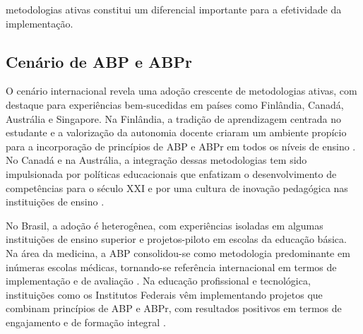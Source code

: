 metodologias ativas constitui um diferencial importante para a efetividade da implementação.

\subsection{Cenário de ABP e ABPr}
\label{subsec:cenario_abp_abpr}

O cenário internacional revela uma adoção crescente de metodologias ativas, com destaque para experiências bem-sucedidas em países como Finlândia, Canadá, Austrália e Singapore. Na Finlândia, a tradição de aprendizagem centrada no estudante e a valorização da autonomia docente criaram um ambiente propício para a incorporação de princípios de ABP e ABPr em todos os níveis de ensino \cite{BONWELL1991}. No Canadá e na Austrália, a integração dessas metodologias tem sido impulsionada por políticas educacionais que enfatizam o desenvolvimento de competências para o século XXI e por uma cultura de inovação pedagógica nas instituições de ensino \cite{BARRON1998}.

No Brasil, a adoção é heterogênea, com experiências isoladas em algumas instituições de ensino superior e projetos-piloto em escolas da educação básica. Na área da medicina, a ABP consolidou-se como metodologia predominante em inúmeras escolas médicas, tornando-se referência internacional em termos de implementação e de avaliação \cite{GOMES2009}. Na educação profissional e tecnológica, instituições como os Institutos Federais vêm implementando projetos que combinam princípios de ABP e ABPr, com resultados positivos em termos de engajamento e de formação integral \cite{SANTOS2019}.

